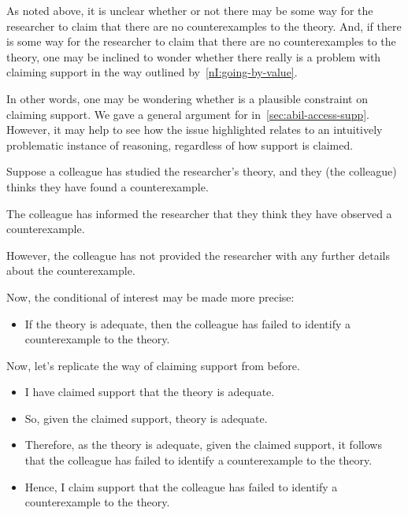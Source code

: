\begin{note}
  As noted above, it is unclear whether or not there may be some way for the researcher to claim that there are no counterexamples to the theory.
  And, if there is some way for the researcher to claim that there are no counterexamples to the theory, one may be inclined to wonder whether there really is a problem with claiming support in the way outlined by~\ref{nI:going-by-value}.

  In other words, one may be wondering whether \eiS{} is a plausible constraint on claiming support.
  We gave a general argument for \eiS{} in~\autoref{sec:abil-access-supp}.
  However, it may help to see how the issue highlighted relates to an intuitively problematic instance of reasoning, regardless of how support is claimed.

  \begin{illustration}\label{ill:CE:colleague}
    Suppose a colleague has studied the researcher's theory, and they (the colleague) thinks they have found a counterexample.

    The colleague has informed the researcher that they think they have observed a counterexample.

    However, the colleague has not provided the researcher with any further details about the counterexample.

    Now, the conditional of interest may be made more precise:
    \begin{itemize}
    \item If the theory is adequate, then the colleague has failed to identify a counterexample to the theory.
    \end{itemize}

    Now, let's replicate the way of claiming support from before.

    \begin{itemize}
    \item I have claimed support that the theory is adequate.
    \item So, given the claimed support, theory is adequate.
    \item Therefore, as the theory is adequate, given the claimed support, it follows that the colleague has failed to identify a counterexample to the theory.
    \item Hence, I claim support that the colleague has failed to identify a counterexample to the theory.
    \end{itemize}
  \end{illustration}


\end{note}
